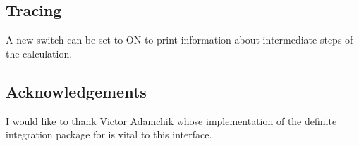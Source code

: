 \subsection{Tracing}
\hypertarget{switch:TRDEFINT}{}

A new switch  can be set to ON to print information about intermediate steps
of the calculation.

\subsection{Acknowledgements}
I would like to thank Victor Adamchik whose implementation of the
definite integration package for {\REDUCE} is vital to this
interface.
